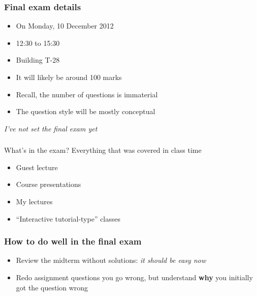 
\begin{frame}\frametitle{Final exam details}
	\begin{itemize}
		\item	On Monday, 10 December 2012
		\item	12:30 to 15:30
		\item	Building T-28
		\item	It will likely be around 100 marks
		\item	Recall, the number of questions is immaterial
		\item	The question style will be mostly conceptual
	\end{itemize}
	\vspace{24pt}
	\emph{I've not set the final exam yet}
\end{frame}

\begin{frame}\frametitle{}
	\begin{exampleblock}{What's in the exam?}
		Everything that was covered in class time
	\end{exampleblock}
	\vspace{24pt}
	\begin{itemize}
		\item	Guest lecture
		\item	Course presentations
		\item	My lectures
		\item	``Interactive tutorial-type'' classes
	\end{itemize}
	
\end{frame}

\begin{frame}\frametitle{How to do well in the final exam}
	\begin{itemize}
		\item	Review the midterm without solutions: \emph{it should be easy now}
		\item	Redo assignment questions you go wrong, but understand \textbf{why} you initially got the question wrong
	\end{itemize}
\end{frame}

